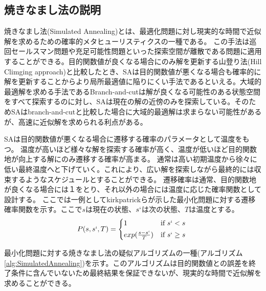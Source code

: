 \documentclass[11pt,a4paper,dvipdfmx,titlepage,uplatex]{jsarticle}
\theoremstyle{mystyle}
\newcommand{\0}{\mathbf{0}}
\begin{document}
	\subsection{焼きなまし法の説明}\label{sec:SA}
	焼きなまし法(Simulated Annealing)とは、最適化問題に対し現実的な時間で近似解を求めるための確率的メタヒューリスティクスの一種である。\cite{kirkpatrick1983optimization} この手法は巡回セールスマン問題\cite{geng2011solving}や充足可能性問題\cite{spears1993simulated}といった探索空間が離散である問題に適用することができる。目的関数値が良くなる場合にのみ解を更新する山登り法(Hill Climging approach)と比較したとき、SAは目的関数値が悪くなる場合も確率的に解を更新することからより局所最適値に陥りにくい手法であるといえる。大域的最適解を求める手法であるBranch-and-cutは解が良くなる可能性のある状態空間をすべて探索するのに対し、SAは現在の解の近傍のみを探索している。そのためSAはbranch-and-cutと比較した場合に大域的最適解は求まらない可能性があるが、高速に近似解を求められる利点がある。
	
	SAは目的関数値が悪くなる場合に遷移する確率のパラメータとして温度をもつ。
	温度が高いほど様々な解を探索する確率が高く、温度が低いほど目的関数地が向上する解にのみ遷移する確率が高まる。
	通常は高い初期温度から徐々に低い最終温度へと下げていく。これにより、広い解を探索しながら最終的には収束するようなスケジュールとすることができる。
	遷移確率は通常、目的関数地が良くなる場合には１をとり、それ以外の場合には温度に応じた確率関数として設計する。
	ここでは一例としてkirkpatrickらが示した最小化問題に対する遷移確率関数を示す。ここで$s$は現在の状態、$s`$は次の状態、$T$は温度とする。
	\begin{equation}  \label{eq: probFunction}
		P(s, s`, T)=
		\begin{cases*}
			1   &   if\ $s`<s$  \\
			exp (\frac{s-s`}{T})     &   if\ $s`\geq s$ 
		\end{cases*}
	\end{equation}
	
	
	最小化問題に対する焼きなまし法の疑似アルゴリズムの一種(アルゴリズム\ref{alg:SimulatedAnnealing})を示す。このアルゴリズムは目的関数値との誤差を終了条件に含んでいないため最終結果を保証できないが、現実的な時間で近似解を求めることができる。
	
\end{document}

